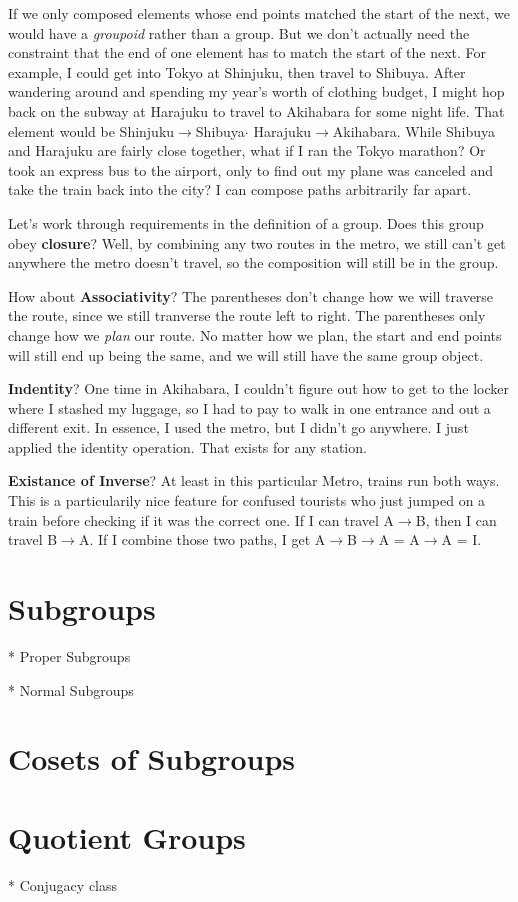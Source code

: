 If we only composed elements whose end points matched the start of the next, we would have a \textit{groupoid} rather than a group.   But we don't actually need the constraint that the end of one element has to match the start of the next.  For example, I could get into Tokyo at Shinjuku, then travel to Shibuya.  After wandering around and spending my year's worth of clothing budget, I might hop back on the subway at Harajuku to travel to Akihabara for some night life.  That element would be Shinjuku$\rightarrow$Shibuya$\cdot$ Harajuku$\rightarrow$Akihabara.  While Shibuya and Harajuku are fairly close together, what if I ran the Tokyo marathon? Or took an express bus to the airport, only to find out my plane was canceled and take the train back into the city?  I can compose paths arbitrarily far apart.

Let's work through requirements in the definition of a group.  Does this group obey \textbf{closure}?  Well, by combining any two routes in the metro, we still can't get anywhere the metro doesn't travel, so the composition will still be in the group.

How about \textbf{Associativity}?  The parentheses don't change how we will traverse the route, since we still tranverse the route left to right.  The parentheses only change how we \textit{plan} our route.  No matter how we plan, the start and end points will still end up being the same, and we will still have the same group object.

\textbf{Indentity}? One time in Akihabara, I couldn't figure out how to get to the locker where I stashed my luggage, so I had to pay to walk in one entrance and out a different exit.  In essence, I used the metro, but I didn't go anywhere.  I just applied the identity operation.  That exists for any station.

\textbf{Existance of Inverse}?  At least in this particular Metro, trains run both ways. This is a particularily nice feature for confused tourists who just jumped on a train before checking if it was the correct one. If I can travel A$\rightarrow$B, then I can travel B$\rightarrow$A.  If I combine those two paths, I get A$\rightarrow$B$\rightarrow$A = A$\rightarrow$A = I.

\section{Subgroups}

* Proper Subgroups

* Normal Subgroups

\section{Cosets of Subgroups}


\section{Quotient Groups}

* Conjugacy class

